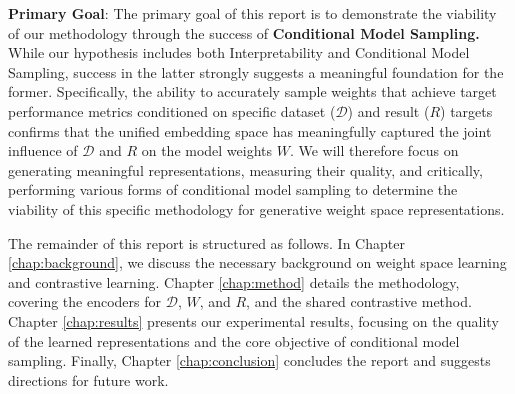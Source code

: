 \textbf{Primary Goal}: The primary goal of this report is to demonstrate the viability of our methodology through the success of \textbf{Conditional Model Sampling.} While our hypothesis includes both Interpretability and Conditional Model Sampling, success in the latter strongly suggests a meaningful foundation for the former. Specifically, the ability to accurately sample weights that achieve target performance metrics conditioned on specific dataset ($\mathcal{D}$) and result ($R$) targets confirms that the unified embedding space has meaningfully captured the joint influence of $\mathcal{D}$ and $R$ on the model weights $W$. We will therefore focus on generating meaningful representations, measuring their quality, and critically, performing various forms of conditional model sampling to determine the viability of this specific methodology for generative weight space representations.

The remainder of this report is structured as follows. In Chapter \ref{chap:background}, we discuss the necessary background on weight space learning and contrastive learning. Chapter \ref{chap:method} details the methodology, covering the encoders for $\mathcal{D}$, $W$, and $R$, and the shared contrastive method. Chapter \ref{chap:results} presents our experimental results, focusing on the quality of the learned representations and the core objective of conditional model sampling. Finally, Chapter \ref{chap:conclusion} concludes the report and suggests directions for future work.
